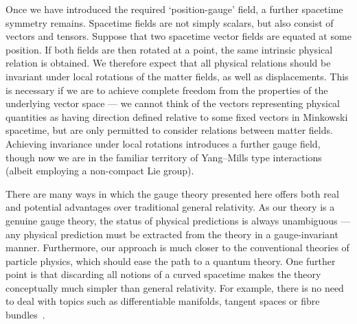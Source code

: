 \documentclass[a4paper]{article}
\numberwithin{equation}{section}
\begin{document}
Once we have introduced the required `position-gauge' field, a further
spacetime symmetry remains.  Spacetime fields are not simply scalars,
but also consist of vectors and tensors.  Suppose that two spacetime
vector fields are equated at some position.  If both fields are then
rotated at a point, the same intrinsic physical relation is obtained.
We therefore expect that all physical relations should be invariant
under local rotations of the matter fields, as well as displacements.
This is necessary if we are to achieve complete freedom from the
properties of the underlying vector space --- we cannot think of the
vectors representing physical quantities as having direction defined
relative to some fixed vectors in Minkowski spacetime, but are only
permitted to consider relations between matter fields.  Achieving
invariance under local rotations introduces a further gauge field,
though now we are in the familiar territory of Yang--Mills type
interactions (albeit employing a non-compact Lie group).


There are many ways in which the gauge theory presented here offers
both real and potential advantages over traditional general
relativity.  As our theory is a genuine gauge theory, the status of
physical predictions is always unambiguous --- any physical prediction
must be extracted from the theory in a gauge-invariant manner.
Furthermore, our approach is much closer to the conventional theories
of particle physics, which should ease the path to a quantum theory.
One further point is that discarding all notions of a curved spacetime
makes the theory conceptually much simpler than general relativity.
For example, there is no need to deal with topics such as
differentiable manifolds, tangent spaces or fibre
bundles~\cite{egu80}.
\end{document}
